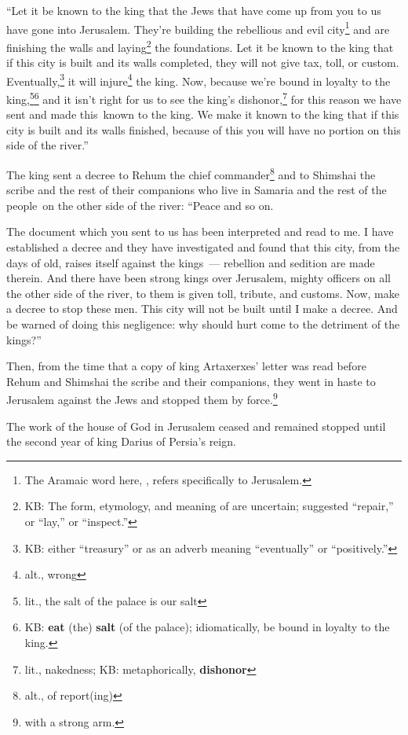 \begin{inparaenum}
     ``Let it be known to the king that the Jews that have come up from you to us have gone into Jerusalem. They're building the rebellious and evil city\footnote{The Aramaic word here, , refers specifically to Jerusalem.} and are finishing the walls and laying\footnote{KB: The form, etymology, and meaning of  are uncertain; suggested ``repair,'' or ``lay,'' or ``inspect.''} the foundations.%
     Let it be known to the king that if this city is built and its walls completed, they will not give tax, toll, or custom. Eventually,\footnote{KB: either ``treasury'' or as an adverb meaning ``eventually'' or ``positively.''} it will injure\footnote{alt., wrong} the king.%
     Now, because we're bound in loyalty to the king,\footnote{lit., the salt of the palace is our salt}\footnote{KB: \textbf{eat} (the) \textbf{salt} (of the palace); idiomatically, be bound in loyalty to the king.} and it isn't right for us to see the king's dishonor,\footnote{lit., nakedness; KB: metaphorically, \textbf{dishonor}} for this reason we have sent and made this\understood\ known to the king.%
     We make it known to the king that if this city is built and its walls finished, because of this you will have no portion on this side of the river.''%
    
     The king sent a decree to Rehum the chief commander\footnote{alt., of report(ing)} and to Shimshai the scribe and the rest of their companions who live in Samaria and the rest of the people\understood\ on the other side of the river: ``Peace and so on.%
    
     The document which you sent to us has been interpreted and read to me.%
     I have established a decree and they have investigated and found that this city, from the days of old, raises itself against the kings~--- rebellion and sedition are made therein.%
     And there have been strong kings over Jerusalem, mighty officers on all the other side of the river, to them is given toll, tribute, and customs.%
     Now, make a decree to stop these men. This city will not be built until I make a decree.%
     And be warned of doing this negligence: why should hurt come to the detriment of the kings?''%
    
     Then, from the time that a copy of king Artaxerxes' letter was read before Rehum and Shimshai the scribe and their companions, they went in haste to Jerusalem against the Jews and stopped them by force.\footnote{with a strong arm.}%
    
     The work of the house of God in Jerusalem ceased and remained stopped until the second year of king Darius of Persia's reign.%
\end{inparaenum}
